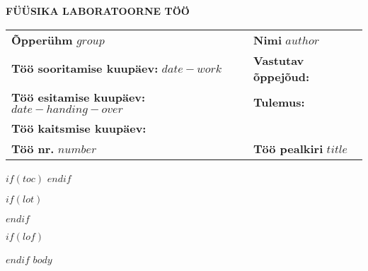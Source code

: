 \documentclass[
	a4paper, %
	12pt, %
	twocolumn,
	onecolumn
]{CSUniSchoolLabReport}
\author{$author$} %
\date{\today} %
\begin{document}
\setlength{\parskip}{12pt}
\renewcommand{\arraystretch}{1}
\setlength\arrayrulewidth{1pt}
\begin{center}
\textbf{\textsf{FÜÜSIKA LABORATOORNE TÖÖ}} \\
\end{center}
\vspace{1cm}
\renewcommand{\arraystretch}{2}
\setlength\arrayrulewidth{1pt}
\begin{tabular}{|m{}|m{}|m{}|}
\hline
    \multicolumn{2}{|m{0.4\textwidth}|}{\textbf{Õpperühm} $group$} & {\textbf{Nimi} $author$}  \\ \cline{1-3}
    \multicolumn{2}{|m{0.4\textwidth}|}{\raggedright\textbf{Töö sooritamise kuupäev:} $date-work$} & {\textbf{Vastutav õppejõud:}} \\ \cline{1-3}
    \multicolumn{2}{|m{0.4\textwidth}|}{\raggedright\textbf{Töö esitamise kuupäev:} $date-handing-over$} & {\textbf{Tulemus:}} \\ \cline{1-2}
    \multicolumn{2}{|m{0.4\textwidth}|}{\textbf{Töö kaitsmise kuupäev:} } & \\ \cline{1-3}
    {\textbf{Töö nr.} $number$} & \multicolumn{2}{|m{0.8\textwidth}|}{\textbf{Töö pealkiri} \hfill \LARGE{$title$}} \\ \hline
\end{tabular}

$if(toc)$
  \setcounter{secnumdepth}{$toc-depth$}
  \setcounter{tocdepth}{$toc-depth$}
  \tableofcontents
$endif$

$if(lot)$
  \listoftables
$endif$

$if(lof)$
  \listoffigures
$endif$
$body$
\end{document}
